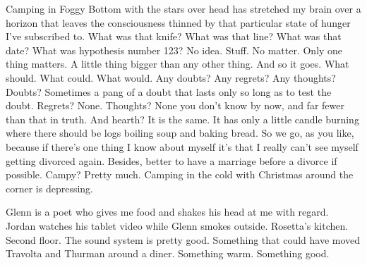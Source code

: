 

Camping in Foggy Bottom with the stars over head has stretched my
brain over a horizon that leaves the consciousness thinned by that
particular state of hunger I've subscribed to.  What was that knife?
What was that line?  What was that date?  What was hypothesis number
123?  No idea.  Stuff.  No matter.  Only one thing matters.  A little
thing bigger than any other thing.  And so it goes.  What should.
What could.  What would.  Any doubts?  Any regrets?  Any thoughts?
Doubts?  Sometimes a pang of a doubt that lasts only so long as to
test the doubt.  Regrets?  None.  Thoughts?  None you don't know by
now, and far fewer than that in truth.  And hearth?  It is the same.
It has only a little candle burning where there should be logs boiling
soup and baking bread.  So we go, as you like, because if there's one
thing I know about myself it's that I really can't see myself getting
divorced again.  Besides, better to have a marriage before a divorce
if possible.  Campy?  Pretty much.  Camping in the cold with Christmas
around the corner is depressing.

Glenn is a poet who gives me food and shakes his head at me with
regard.  Jordan watches his tablet video while Glenn smokes outside.
Rosetta's kitchen.  Second floor.  The sound system is pretty good.
Something that could have moved Travolta and Thurman around a diner.
Something warm.  Something good.

\bye
